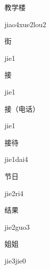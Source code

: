 \begin{verbete}{教学楼}
\begin{pronuncia}{jiao4xue2lou2}
\end{pronuncia}
\end{verbete}

\begin{verbete}[jie1]{街}
\begin{pronuncia}{jie1}
\end{pronuncia}
\end{verbete}

\begin{verbete}[jie1]{接}
\begin{pronuncia}{jie1}
\end{pronuncia}
\end{verbete}

\begin{verbete}[jie1]{接（电话）}
\begin{pronuncia}{jie1}
\end{pronuncia}
\end{verbete}

\begin{verbete}{接待}
\begin{pronuncia}{jie1dai4}
\end{pronuncia}
\end{verbete}

\begin{verbete}[jie2ri4]{节日}
\begin{pronuncia}{jie2ri4}
\end{pronuncia}
\end{verbete}

\begin{verbete}{结果}
\begin{pronuncia}{jie2guo3}
\end{pronuncia}
\end{verbete}

\begin{verbete}{姐姐}
\begin{pronuncia}{jie3jie0}
\end{pronuncia}
\end{verbete}

